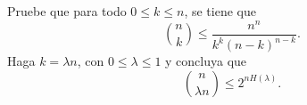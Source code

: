 \begin{statement}{27}
  Pruebe que para todo $0 \leq k \leq n$, se tiene que
  \[
    \binom{n}{k} \leq \frac{n^n}{k^k (n - k)^{n - k}}.
  \]
  Haga $k = \lambda n$, con $0 \leq \lambda \leq 1$ y concluya que
  \[
    \binom{n}{\lambda n} \leq 2^{n H(\lambda)}.
  \]
\end{statement}